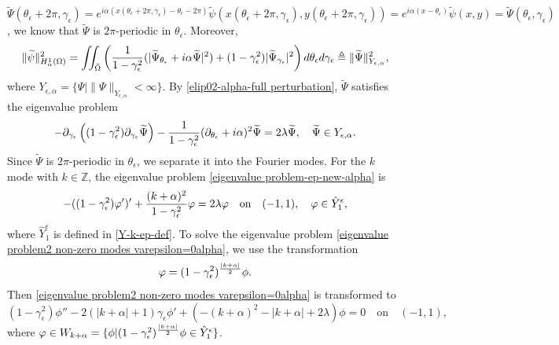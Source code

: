 \documentclass[1 [leqno, 11pt]{amsart}
\numberwithin{equation}{section}
\let\ep=\epsilon
\let\pa=\partial
\begin{document}
\begin{CJK*}{GBK}{song}
$\widetilde\Psi(\theta_\ep+2\pi,\gamma_\ep)=e^{i\alpha(x(\theta_\ep+2\pi,\gamma_\ep)-\theta_\ep-2\pi)}
\widetilde\psi(x(\theta_\ep+2\pi,\gamma_\ep),y(\theta_\ep+2\pi,\gamma_\ep))=e^{i\alpha( x-\theta_\ep)}
\widetilde\psi(x,y)=\widetilde\Psi(\theta_\ep,\gamma_\ep)$, we know that  $\widetilde\Psi$ is $2\pi$-periodic  in $\theta_\ep$.
Moreover,
\begin{align*}
 \|\widetilde\psi\|_{{H}_\alpha^1(\Omega)}^2=\iint_{\tilde \Omega}\left({1\over1-\gamma_\ep^2}(|\widetilde\Psi_{\theta_\ep}+i\alpha\widetilde\Psi|^2)+(1-\gamma_\ep^2)|\widetilde\Psi_{\gamma_\ep}|^2\right)d \theta_\ep d\gamma_\ep\triangleq\|\widetilde\Psi\|_{Y_{\ep,\alpha}}^2,
\end{align*}
where $Y_{\ep,\alpha}=\{\Psi|\|\Psi\|_{Y_{\ep,\alpha}}<\infty\}$. By \eqref{elip02-alpha-full perturbation},
$\widetilde\Psi$ satisfies the eigenvalue problem
\begin{align}\label{eigenvalue problem-ep-new-alpha}
-\pa_{\gamma_\ep}\left((1-\gamma_\ep^2)\pa_{\gamma_\ep}\widetilde\Psi\right)-{1\over1-\gamma_\ep^2}(\pa_{\theta_\ep}+i\alpha)^2\widetilde\Psi
=2\lambda\widetilde\Psi, \quad \widetilde\Psi \in Y_{\ep,\alpha}.
\end{align}
Since $\widetilde\Psi$ is $2\pi$-periodic  in $\theta_\ep$, we separate it into the Fourier modes.
For the $k$ mode with $k\in\mathbb{Z}$, the eigenvalue problem \eqref{eigenvalue problem-ep-new-alpha}
is
\begin{equation}\label{eigenvalue problem2 non-zero modes varepsilon=0alpha}
-((1-\gamma_\ep^2)\varphi')'+{(k+\alpha)^2\over1-\gamma_\ep^2}\varphi =2\lambda\varphi \quad \text{on}\quad (-1,1),\quad\varphi\in \hat Y_1^\ep,
\end{equation}
where $
\hat Y_1^\ep
$ is defined in \eqref{Y-k-ep-def}.
To
 solve the eigenvalue problem \eqref{eigenvalue problem2 non-zero modes varepsilon=0alpha},
we use the transformation
\begin{align}\label{modulational-transformation}
\varphi=(1-\gamma_\ep^2)^{|k+\alpha|\over2}\phi.
\end{align}
Then \eqref{eigenvalue problem2 non-zero modes varepsilon=0alpha} is transformed to
\begin{equation}\label{eigenvalue problem2 non-zero modes varepsilon=0-transform-alpha}
(1-\gamma_\ep^2)\phi''-2\left(|k+\alpha|+1\right)\gamma_\ep\phi'+\left(-(k+\alpha)^2-|k+\alpha|+2\lambda\right)\phi =0 \quad \text{on}\quad (-1,1),
\end{equation}
where $\varphi\in W_{k+\alpha}=\{\phi|(1-\gamma_\ep^2)^{|k+\alpha|\over2}\phi\in\hat Y_1^\ep\}$.

\end{CJK*}
\end{document}
